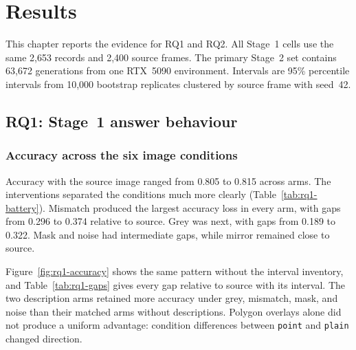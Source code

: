 
\chapter{Results}
\label{ch:results}

\newenvironment{chSixFigureHere}{%
  \begingroup
  \renewenvironment{figure}[1][]{%
    \par\begin{center}\begin{minipage}{\linewidth}%
    \captionsetup{type=figure}%
  }{\end{minipage}\end{center}\par}%
}{\endgroup}

This chapter reports the evidence for RQ1 and RQ2. All Stage~1
cells use the same 2,653 records and 2,400 source frames. The primary Stage~2
set contains 63,672 generations from one RTX~5090 environment.
Intervals are 95\% percentile intervals from 10,000 bootstrap replicates
clustered by source frame with seed~42.

\section{RQ1: Stage~1 answer behaviour}
\label{sec:results-rq1}

\subsection{Accuracy across the six image conditions}
\label{sec:results-rq1-accuracy}

Accuracy with the source image ranged from 0.805 to 0.815 across arms. The
interventions separated the
conditions much more clearly (Table~\ref{tab:rq1-battery}). Mismatch produced
the largest accuracy loss in every arm, with gaps from 0.296 to 0.374 relative
to source. Grey was next, with gaps from 0.189 to 0.322. Mask and noise had
intermediate gaps, while mirror remained close to source.



Figure~\ref{fig:rq1-accuracy} shows the same pattern without the interval
inventory, and Table~\ref{tab:rq1-gaps} gives every gap relative to source with
its interval. The two description arms retained more accuracy under grey,
mismatch, mask, and noise than their matched arms without descriptions. Polygon
overlays alone did not produce a uniform advantage: condition differences
between \texttt{point} and \texttt{plain} changed direction.

